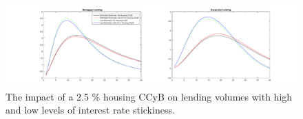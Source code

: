 \documentclass[12pt]{article}
\numberwithin{equation}{section}
\begin{document}
\begin{figure}[H]
\centering
\caption{The impact of a 2.5 \% housing CCyB on lending volumes with high and low levels of interest rate stickiness.}
\label{irf_stickiness_housingCCyB}
\includegraphics[scale=0.35]{stickiness_housing_ccybECAB.pdf}
\end{figure}
\end{document}
